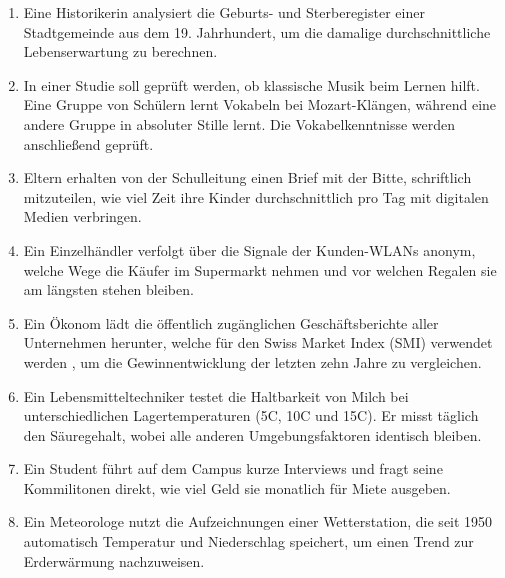 \begin{enumerate}
\item
Eine Historikerin analysiert die Geburts- und Sterberegister einer Stadtgemeinde aus dem 19. Jahrhundert, um die
    damalige durchschnittliche Lebenserwartung zu berechnen. 

\item
In einer Studie soll geprüft werden, ob klassische Musik beim Lernen hilft. Eine Gruppe von Schülern lernt
    Vokabeln bei Mozart-Klängen, während eine andere Gruppe in absoluter Stille lernt. Die Vokabelkenntnisse werden
    anschließend geprüft. 

\item
Eltern erhalten von der Schulleitung einen Brief mit der Bitte, schriftlich mitzuteilen, wie viel Zeit ihre Kinder
    durchschnittlich pro Tag mit digitalen Medien verbringen. 

\item
Ein Einzelhändler verfolgt über die Signale der Kunden-WLANs anonym, welche Wege die Käufer im Supermarkt
    nehmen und vor welchen Regalen sie am längsten stehen bleiben. 

\item
Ein Ökonom lädt die öffentlich zugänglichen Geschäftsberichte aller Unternehmen herunter, welche für den Swiss
    Market Index (SMI) verwendet werden , um die Gewinnentwicklung der letzten zehn Jahre zu vergleichen. 

\item
Ein Lebensmitteltechniker testet die Haltbarkeit von Milch bei unterschiedlichen Lagertemperaturen (5\degre{}C, 10\degre{}C und 15\degre{}C).
    Er misst täglich den Säuregehalt, wobei alle anderen Umgebungsfaktoren identisch bleiben. 

\item
Ein Student führt auf dem Campus kurze Interviews und fragt seine Kommilitonen direkt, wie viel Geld sie monatlich für Miete ausgeben. 

\item
Ein Meteorologe nutzt die Aufzeichnungen einer Wetterstation, die seit 1950 automatisch Temperatur und Niederschlag speichert, um einen Trend zur Erderwärmung nachzuweisen. 
\end{enumerate}



